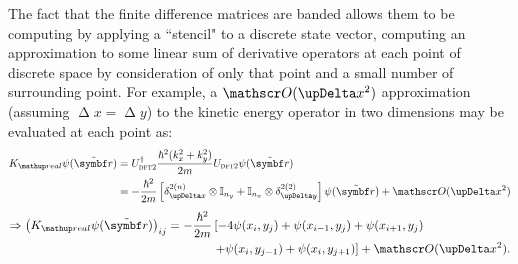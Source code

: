 The fact that the finite difference matrices are banded allows them to be computing by applying a ``stencil" to a discrete state vector, computing an approximation to some linear sum of derivative operators at each point of discrete space by consideration of only that point and a small number of surrounding point. For example, a $\Ord{\upDelta x^2}$ approximation (assuming $\upDelta x = \upDelta y$) to the kinetic energy operator in two dimensions may be evaluated at each point as:
\begin{align}
K_\up{real}\psi(\tilde{\vec r}) & = U^\dagger_{\textsc{dft2}} \frac{\hbar^2 (k_x^2 + k_y^2)}{2m} U_{\textsc{dft2}}\psi(\tilde{\vec r})\label{eq:2DKreal}\\
&= -\frac{\hbar^2}{2m} \left[
  \delta^{2 (n)}_{\upDelta x} \otimes \mathbb{I}_{n_y}
+ \mathbb{I}_{n_x} \otimes \delta^{2 (2)}_{\upDelta y}\right]\psi(\tilde{\vec r}) + \Ord{\upDelta x^2}\label{eq:finite_differences_subspaces}
\end{align} 
\begin{align}
\Rightarrow \left(K_\up{real}\psi(\tilde{\vec r})\right)_{ij}
= -\frac{\hbar^2}{2m} &\left[ - 4\psi(x_i,  y_j)
                             + \psi(x_{i-1},  y_j) + \psi(x_{i+1},  y_j) \right.\nonumber\\
                            &\left.  + \psi(x_i,  y_{j-1}) + \psi(x_i,  y_{j+1})\right] + \Ord{\upDelta x^2}.
\end{align} 

